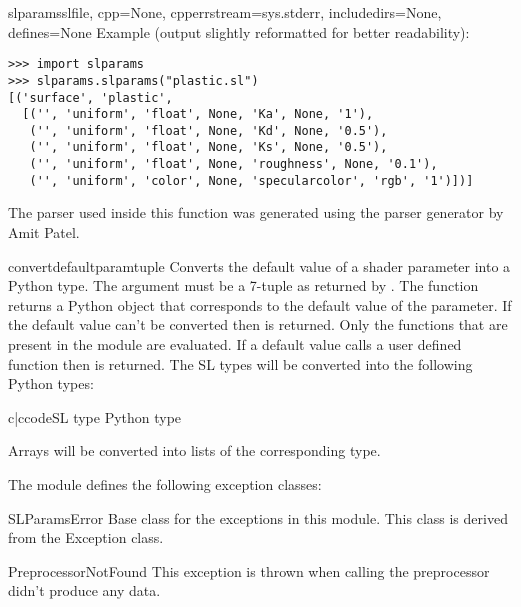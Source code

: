 \begin{funcdesc}{slparams}{slfile, cpp=None, cpperrstream=sys.stderr, includedirs=None, defines=None}
Example (output slightly reformatted for better readability):
 
\begin{verbatim}
>>> import slparams
>>> slparams.slparams("plastic.sl")
[('surface', 'plastic', 
  [('', 'uniform', 'float', None, 'Ka', None, '1'),
   ('', 'uniform', 'float', None, 'Kd', None, '0.5'),
   ('', 'uniform', 'float', None, 'Ks', None, '0.5'),
   ('', 'uniform', 'float', None, 'roughness', None, '0.1'),
   ('', 'uniform', 'color', None, 'specularcolor', 'rgb', '1')])]
\end{verbatim}

The parser used inside this function was generated using the parser
generator  
by Amit Patel.
\end{funcdesc}

\begin{funcdesc}{convertdefault}{paramtuple}
Converts the default value of a shader parameter into a Python
type. The argument  must be a 7-tuple as returned by
. The function returns a Python object that corresponds to
the default value of the parameter. If the default value can't be
converted then  is returned. Only the functions that are
present in the  module are evaluated. If a default value
calls a user defined function then  is returned. The SL
types will be converted into the following Python types:

\begin{tableii}{c|c}{code}{SL type }{ Python type}
\end{tableii}

Arrays will be converted into lists of the corresponding type.
\end{funcdesc}

The module defines the following exception classes:

\begin{excdesc}{SLParamsError}
Base class for the exceptions in this module. This class is derived
from the Exception class.
\end{excdesc}

\begin{excdesc}{PreprocessorNotFound}
This exception is thrown when calling the preprocessor didn't produce
any data.
\end{excdesc}

